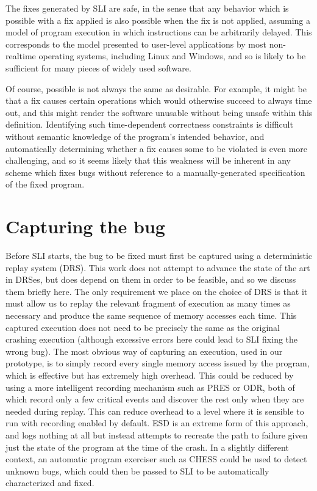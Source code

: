 \documentclass[10pt,twocolumn,preprint,natbib,authoryear]{sigplanconf}
\newcommand{\editorial}[1]{}
\begin{document}
The fixes generated by SLI are safe, in the sense that any behavior
which is possible with a fix applied is also possible when the fix is
not applied, assuming a model of program execution in which
instructions can be arbitrarily delayed.  This corresponds to the
model presented to user-level applications by most non-realtime
operating systems, including Linux and Windows, and so is likely to be
sufficient for many pieces of widely used software.

Of course, possible is not always the same as desirable.  For example,
it might be that a fix causes certain operations which would otherwise
succeed to always time out, and this might render the software
unusable without being unsafe within this definition.  Identifying
such time-dependent correctness constraints is difficult without
semantic knowledge of the program's intended behavior, and
automatically determining whether a fix causes some to be violated is
even more challenging, and so it seems likely that this weakness will
be inherent in any scheme which fixes bugs without reference to a
manually-generated specification of the fixed program.\editorial{Not
  very happy with that phrasing.}

\section{Capturing the bug}

Before SLI starts, the bug to be fixed must first be captured using a
deterministic replay system (DRS).  This work does not attempt to
advance the state of the art in DRSes, but does depend on them in
order to be feasible, and so we discuss them briefly here.  The only
requirement we place on the choice of DRS is that it must allow us to
replay the relevant fragment of execution as many times as necessary
and produce the same sequence of memory accesses each time.  This
captured execution does not need to be precisely the same as the
original crashing execution (although excessive errors here could lead
to SLI fixing the wrong bug).  The most obvious way of capturing an
execution, used in our prototype, is to simply record every single
memory access issued by the program, which is effective but has
extremely high overhead.  This could be reduced by using a more
intelligent recording mechanism such as PRES or ODR\cite{Altekar2009},
both of which record only a few critical events and discover the rest
only when they are needed during replay.  This can reduce overhead to
a level where it is sensible to run with recording enabled by default.
ESD\cite{Zamfir2010} is an extreme form of this approach, and logs
nothing at all but instead attempts to recreate the path to failure
given just the state of the program at the time of the crash.  In a
slightly different context, an automatic program exerciser such as
CHESS\cite{Musuvathi2008} could be used to detect unknown bugs, which
could then be passed to SLI to be automatically characterized and
fixed.\editorial{I want to use the phrase closed-loop here}
\end{document}
